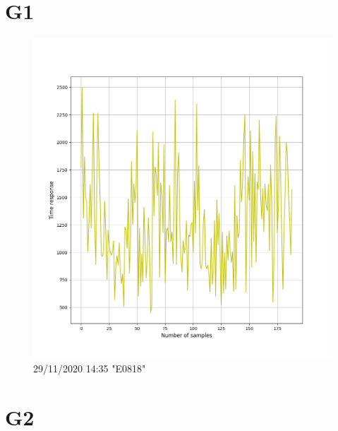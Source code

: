 \documentclass[hidelinks, 12pt, a4paper]{article}
\begin{document}



\pagebreak
\tableofcontents
\pagebreak



\section{G1}


\begin{figure}[h!]
\centering
	\includegraphics[height=.38\textheight, width=\textwidth]{assets/session2/g1.png}
	\caption{29/11/2020 14:35 "E0818"} 
\end{figure}

\section{G2}
\end{document}
